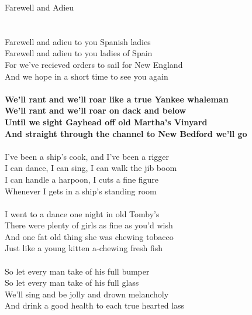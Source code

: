 \documentclass[letterpaper,9pt]{article}
\begin{document}
\newpage
{}
\huge
Farewell and Adieu\\
\\
\noindent
\LARGE
\\Farewell and adieu to you Spanish ladies
\\Farewell and adieu to you ladies of Spain
\\For we’ve recieved orders to sail for New England
\\And we hope in a short time to see you again
\\
\\\textbf{We’ll rant and we’ll roar like a true Yankee whaleman
\\We’ll rant and we’ll roar on dack and below
\\Until we sight Gayhead off old Martha’s Vinyard
\\And straight through the channel to New Bedford we’ll go}
\\
\\I’ve been a ship’s cook, and I’ve been a rigger
\\I can dance, I can sing, I can walk the jib boom
\\I can handle a harpoon, I cuts a fine figure 
\\Whenever I gets in a ship’s standing room
\\
\\I went to a dance one night in old Tomby’s
\\There were plenty of girls as fine as you’d wish
\\And one fat old thing she was chewing tobacco
\\Just like a young kitten a-chewing fresh fish
\\
\\So let every man take of his full bumper
\\So let every man take of his full glass
\\We’ll sing and be jolly and drown melancholy
\\And drink a good health to each true hearted lass
\end{document}
